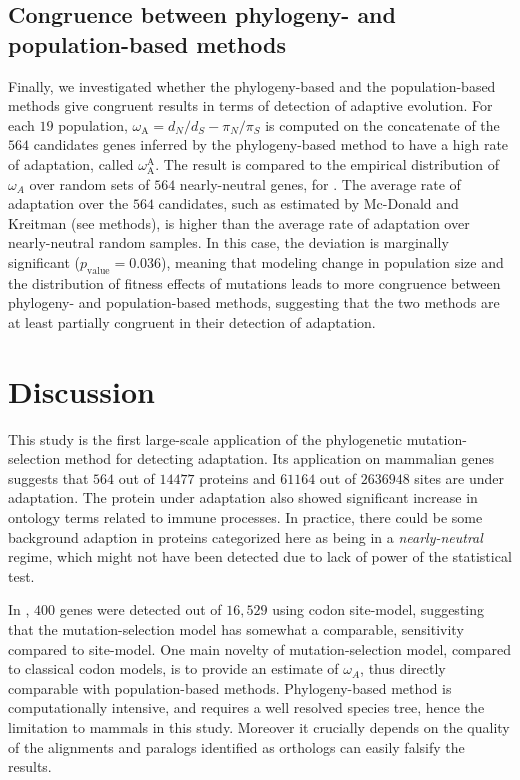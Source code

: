 \documentclass{article}
\newcommand{\dn}{d_N}
\newcommand{\ds}{d_S}
\newcommand{\dnds}{\dn / \ds}
\newcommand{\pn}{\pi_N}
\newcommand{\ps}{\pi_S}
\newcommand{\pnps}{\pn / \ps}
\begin{document}
\subsection*{Congruence between phylogeny- and population-based methods}
Finally, we investigated whether the phylogeny-based and the population-based methods give congruent results in terms of detection of adaptive evolution.
For each $19$ population, $\omega_{\text{A}}=\dnds - \pnps$ is computed on the concatenate of the $564$ candidates genes inferred by the phylogeny-based method to have a high rate of adaptation, called $\omega_{\text{A}}^{\text{A}}$.
The result is compared to the empirical distribution of $\omega_A$ over random sets of $564$ nearly-neutral genes, for .
The average rate of adaptation over the $564$ candidates, such as estimated by Mc-Donald and Kreitman (see methods), is higher than the average rate of adaptation over nearly-neutral random samples.
In this case, the deviation is marginally significant ($p_{\mathrm{value}}=0.036$),
meaning that modeling change in population size and the distribution of fitness effects of mutations leads to more congruence between phylogeny- and population-based methods, suggesting that the two methods are at least partially congruent in their detection of adaptation.

\section*{Discussion}

This study is the first large-scale application of the phylogenetic mutation-selection method for detecting adaptation.
Its application on mammalian genes suggests that $564$ out of $14477$ proteins and $61164$ out of $2636948$ sites are under adaptation.
The protein under adaptation also showed significant increase in ontology terms related to immune processes.
In practice, there could be some background adaption in proteins categorized here as being in a \textit{nearly-neutral} regime, which might not have been detected due to lack of power of the statistical test.

In \cite{kosiol_patterns_2008}, $400$ genes were detected out of $16,529$ using codon site-model, suggesting that the mutation-selection model has somewhat a comparable, sensitivity compared to site-model.
One main novelty of mutation-selection model, compared to classical codon models, is to provide an estimate of $\omega_A$, thus directly comparable with population-based methods.
Phylogeny-based method is computationally intensive, and requires a well resolved species tree, hence the limitation to mammals in this study.
Moreover it crucially depends on the quality of the alignments and paralogs identified as orthologs can easily falsify the results.
\end{document}
